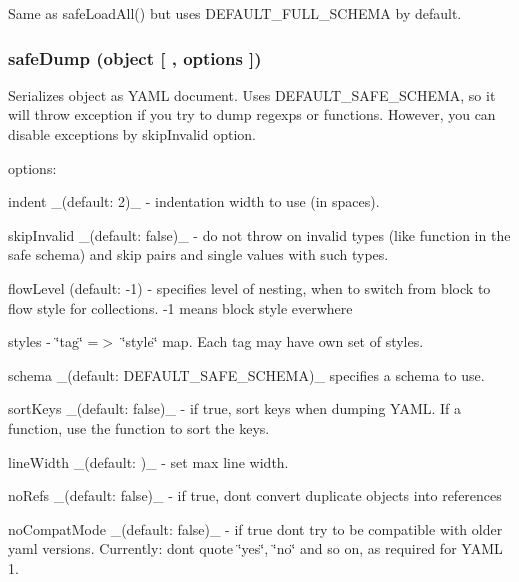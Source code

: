 Same as {\ttfamily safe\+Load\+All()} but uses {\ttfamily D\+E\+F\+A\+U\+L\+T\+\_\+\+F\+U\+L\+L\+\_\+\+S\+C\+H\+E\+MA} by default.

\subsubsection*{safe\+Dump (object \mbox{[} , options \mbox{]})}

Serializes {\ttfamily object} as Y\+A\+ML document. Uses {\ttfamily D\+E\+F\+A\+U\+L\+T\+\_\+\+S\+A\+F\+E\+\_\+\+S\+C\+H\+E\+MA}, so it will throw exception if you try to dump regexps or functions. However, you can disable exceptions by {\ttfamily skip\+Invalid} option.

options\+:


\begin{DoxyItemize}
\item {\ttfamily indent} \+\_\+(default\+: 2)\+\_\+ -\/ indentation width to use (in spaces).
\item {\ttfamily skip\+Invalid} \+\_\+(default\+: false)\+\_\+ -\/ do not throw on invalid types (like function in the safe schema) and skip pairs and single values with such types.
\item {\ttfamily flow\+Level} (default\+: -\/1) -\/ specifies level of nesting, when to switch from block to flow style for collections. -\/1 means block style everwhere
\item {\ttfamily styles} -\/ \char`\"{}tag\char`\"{} =$>$ \char`\"{}style\char`\"{} map. Each tag may have own set of styles.
\item {\ttfamily schema} \+\_\+(default\+: {\ttfamily D\+E\+F\+A\+U\+L\+T\+\_\+\+S\+A\+F\+E\+\_\+\+S\+C\+H\+E\+MA})\+\_\+ specifies a schema to use.
\item {\ttfamily sort\+Keys} \+\_\+(default\+: {\ttfamily false})\+\_\+ -\/ if {\ttfamily true}, sort keys when dumping Y\+A\+ML. If a function, use the function to sort the keys.
\item {\ttfamily line\+Width} \+\_\+(default\+: {})\+\_\+ -\/ set max line width.
\item {\ttfamily no\+Refs} \+\_\+(default\+: {\ttfamily false})\+\_\+ -\/ if {\ttfamily true}, don\textquotesingle{}t convert duplicate objects into references
\item {\ttfamily no\+Compat\+Mode} \+\_\+(default\+: {\ttfamily false})\+\_\+ -\/ if {\ttfamily true} don\textquotesingle{}t try to be compatible with older yaml versions. Currently\+: don\textquotesingle{}t quote \char`\"{}yes\char`\"{}, \char`\"{}no\char`\"{} and so on, as required for Y\+A\+ML 1.
\end{DoxyItemize}

